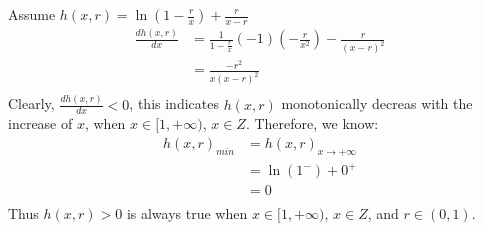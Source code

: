 \documentclass[sigconf]{acmart}
\begin{document}
Assume $h(x,r) = \ln (1-\frac{r}{x}) + \frac{r}{x-r}$
\begin{equation}
\begin{split}
\frac{dh(x,r)}{dx} &= \frac{1}{1-\frac{r}{x}} (-1)(-\frac{r}{x^2}) - \frac{r}{(x-r)^2} \\
&= \frac{-r^2}{x(x-r)^2} \\
\end{split}
\end{equation}
Clearly, $\frac{dh(x,r)}{dx} < 0$, this indicates $h(x,r)$ monotonically decreas with the increase of $x$, when $x\in [1, +\infty)$, $x\in Z$. Therefore, we know:
\begin{equation}
\begin{split}
h(x,r)_{min} &= h(x,r)_{x\rightarrow +\infty} \\
&= \ln (1^-) + 0^+ \\
&= 0\\
\end{split}
\end{equation}
Thus $h(x,r) > 0$ is always true when $x\in [1, +\infty)$, $x\in Z$, and $r\in (0,1)$.
\end{document}
